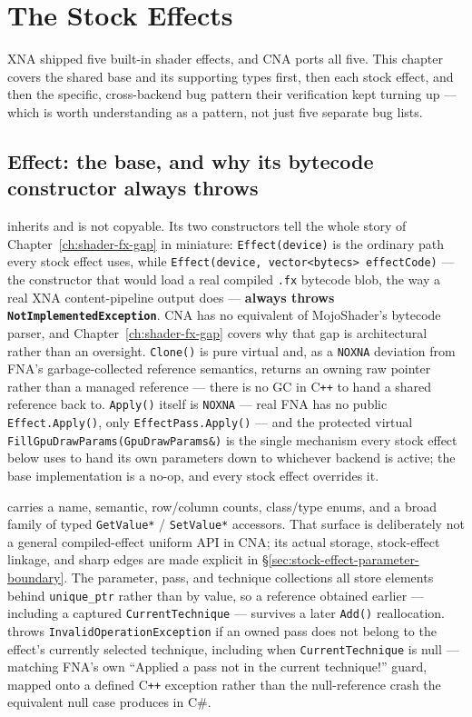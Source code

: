 \chapter{The Stock Effects}
\label{ch:stock-effects}

XNA shipped five built-in shader effects, and CNA ports all five. This chapter covers the
shared  base and its supporting types first, then each stock effect, and
then the specific, cross-backend bug pattern their verification kept turning up --- which is
worth understanding as a pattern, not just five separate bug lists.

\section{Effect: the base, and why its bytecode constructor always throws}

 inherits  and is not copyable. Its two
constructors tell the whole story of Chapter~\ref{ch:shader-fx-gap} in miniature:
\texttt{Effect(device)} is the ordinary path every stock effect uses, while
\texttt{Effect(device, vector<bytecs> effectCode)} --- the constructor that would load a
real compiled \texttt{.fx} bytecode blob, the way a real XNA content-pipeline output does ---
\textbf{always throws \texttt{NotImplementedException}}. CNA has no equivalent of
MojoShader's bytecode parser, and Chapter~\ref{ch:shader-fx-gap} covers why that gap is
architectural rather than an oversight. \texttt{Clone()} is pure virtual and, as a
\texttt{NOXNA} deviation from FNA's garbage-collected reference semantics, returns an owning
raw pointer rather than a managed reference --- there is no GC in C\texttt{++} to hand a
shared reference back to. \texttt{Apply()} itself is \texttt{NOXNA} --- real FNA has no
public \texttt{Effect.Apply()}, only \texttt{EffectPass.Apply()} --- and the protected virtual
\texttt{FillGpuDrawParams(GpuDrawParams\&)} is the single mechanism every stock effect below
uses to hand its own parameters down to whichever backend is active; the base implementation
is a no-op, and every stock effect overrides it.

 carries a name, semantic, row/column counts, class/type enums, and a
broad family of typed \texttt{GetValue*} / \texttt{SetValue*} accessors. That surface is
deliberately not a general compiled-effect uniform API in CNA; its actual storage, stock-effect
linkage, and sharp edges are made explicit in \S\ref{sec:stock-effect-parameter-boundary}. The
parameter, pass, and technique collections all store elements behind \texttt{unique\_ptr} rather
than by value, so a reference obtained earlier --- including a captured \texttt{CurrentTechnique}
--- survives a later \texttt{Add()} reallocation.  throws
\texttt{InvalidOperationException} if an owned pass does not belong to the effect's currently
selected technique, including when \texttt{CurrentTechnique} is null --- matching FNA's own
``Applied a pass not in the current technique!'' guard, mapped onto a defined C\texttt{++}
exception rather than the null-reference crash the equivalent null case produces in C\#.

